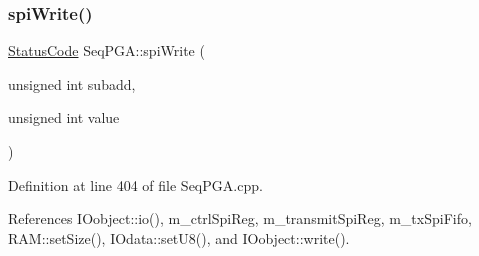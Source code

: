 \subsubsection{\texorpdfstring{spi\+Write()}{spiWrite()}\hspace{0.1cm}{\footnotesize\ttfamily [3/3]}}
{\footnotesize\ttfamily \hyperlink{classStatusCode}{Status\+Code} Seq\+P\+G\+A\+::spi\+Write (\begin{DoxyParamCaption}\item[{unsigned int}]{subadd,  }\item[{unsigned int}]{value }\end{DoxyParamCaption})}



Definition at line 404 of file Seq\+P\+G\+A.\+cpp.



References I\+Oobject\+::io(), m\+\_\+ctrl\+Spi\+Reg, m\+\_\+transmit\+Spi\+Reg, m\+\_\+tx\+Spi\+Fifo, R\+A\+M\+::set\+Size(), I\+Odata\+::set\+U8(), and I\+Oobject\+::write().



